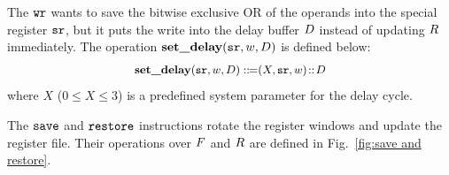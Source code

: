 The $\texttt{wr}$ wants to save the bitwise exclusive OR of
the operands into the special register $\texttt{sr}$, but
it puts the write into the delay buffer $D$
instead of updating $R$ immediately.
The operation $\textbf{set\_delay}(\texttt{sr}, w, D)$
is defined below:
\[
	\small
	\begin{array}{l}
		\textbf{set\_delay}(\texttt{sr}, w, D) ::\!\!{=} (X, \texttt{sr}, w)
		\!::\! D \\
	\end{array}
\]
where $X$ ($0 \leq X \leq 3$) is a
predefined system parameter for the delay cycle.

The $\texttt{save}$ and $\texttt{restore}$ instructions rotate
the register windows and update the register file.
Their operations over $F$ and $R$
are defined in Fig.~\ref{fig:save and restore}.

%
%
%
